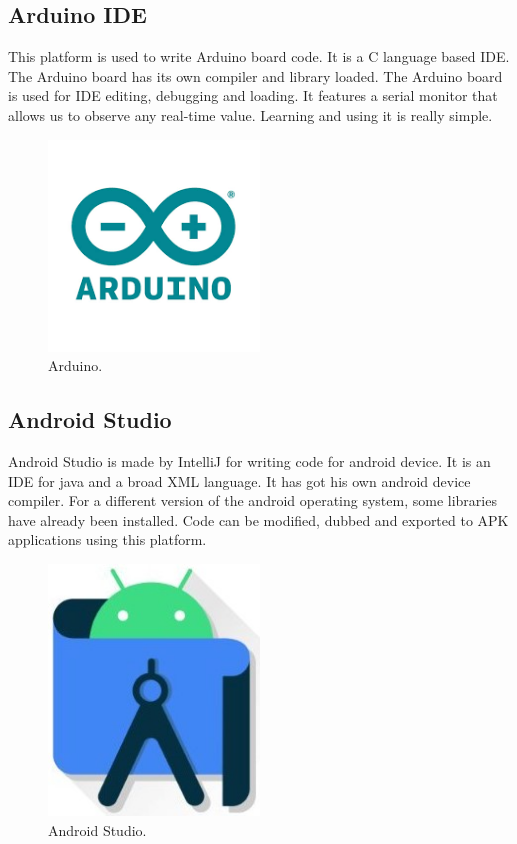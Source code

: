 \subsection{Arduino IDE}
This platform is used to write Arduino board code. It is a C language based IDE. The Arduino board has its own compiler and library loaded. The Arduino board is used for IDE editing, debugging and loading. It features a serial monitor that allows us to observe any real-time value. Learning and using it is really simple.
\begin{figure}[H]
\centering
\includegraphics[width=0.5\textwidth]{figures/Arduino Software.png}
\caption{Arduino.}
\label{Arduino IDE}
\end{figure}
\subsection{Android Studio}
Android Studio is made by IntelliJ for writing code for android device. It is an IDE for java and a broad XML language. It has got his own android device compiler. For a different version of the android operating system, some libraries have already been installed. Code can be modified, dubbed and exported to APK applications using this platform.
\begin{figure}[H]
\centering
\includegraphics[width=0.5\textwidth]{figures/Android Studio.jpg}
\caption{Android Studio.}
\label{Android Studio}
\end{figure}
